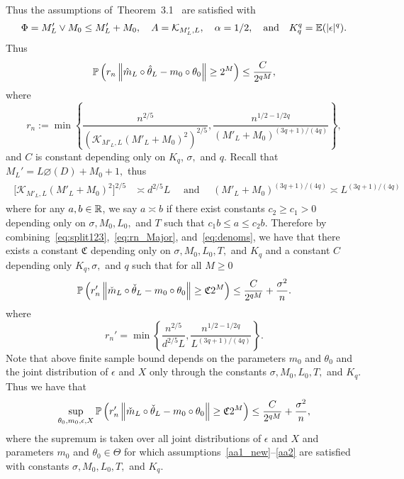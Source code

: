 Thus the assumptions of~{Theorem~3.1}~\cite{KuchiPatra19} are satisfied with 
\begin{equation}\label{eq:notation_matching}
\Phi = M'_L \vee M_0 \le M'_L+M_0, \quad A =\mathcal{K}_{M'_L, L}, \quad \alpha =1/2, \quad \text{and} \quad K_q^q =\mathbb{E}(|\epsilon|^q). 
\end{equation}
Thus
\begin{equation}\label{eq:Tail_majorgeneral}
\mathbb{P}\left(r_n\left\lVert\hat{m}_{L}\circ\hat{\theta}_{L} - m_0\circ\theta_0\right\rVert \ge 2^M\right)\le  \frac{C}{2^{qM}},
\end{equation}
where 
\begin{equation}\label{eq:rn_Major}
r_n:= \min \left\{  \frac{n^{2/5}}{(\mathcal{K}_{M'_L, L} (M'_L+M_0)^2)^{2/5}},  \frac{n^{1/2-1/2q}}{( M'_L+M_0)^{(3q+ 1)/(4q)}} \right\},\end{equation}
and $C$ is constant depending only on $K_q$, $\sigma,$ and $q$. Recall that $M_L'=L\diameter(D) + M_0 + 1,$ thus 
\begin{align}\label{eq:denoms}
\begin{split}
\big[\mathcal{K}_{M'_L, L} (M'_L+M_0)^2\big]^{2/5} &\asymp d^{2/5}L\quad \text{ and }\quad
( M'_L+M_0)^{(3q+ 1)/(4q)} \asymp L^{(3q+ 1)/(4q)}
\end{split}
\end{align}
where for any $a,b\in\mathbb{R}$, we say $a\asymp b$ if there exist constants $c_2 \ge c_1 > 0$ depending only on $\sigma, M_0, L_0,$ and $T$ such that $c_1 b \le a \le c_2b$.
Therefore by combining~\eqref{eq:split123},~\eqref{eq:rn_Major}, and~\eqref{eq:denoms}, we have that there exists a constant $\mathfrak{C}$ depending only on $\sigma, M_0, L_0, T,$ and $K_q$ and a constant $C$ depending only $K_q, \sigma,$ and $q$ such that for all $M\ge 0$ 
 \[
 \mathbb{P}\left( r_n'\left\lVert\check{m}_L\circ\check{\theta}_L - m_0\circ\theta_0\right\rVert \ge \mathfrak{C}2^M\right) \le \frac{C}{2^{qM}}+ \frac{\sigma^2}{n}.
 \]
 where 
 \begin{equation}\label{eq:rnprime}
 r_n'= \min \left\{  \frac{n^{2/5}}{d^{2/5}L},  \frac{n^{1/2-1/2q}}{L^{(3q+ 1)/(4q)}} \right\}.
 \end{equation} Note that above finite sample bound depends on the parameters $m_0$ and $\theta_0$ and the joint distribution of $\epsilon$ and $X$ only through the constants $\sigma, M_0, L_0, T,$ and $K_q$. Thus we have that 
\[ \sup_{\theta_0, m_0,\epsilon, X}  \mathbb{P}\left( r_n'\left\lVert\check{m}_L\circ\check{\theta}_L - m_0\circ\theta_0\right\rVert \ge \mathfrak{C}2^M\right) \le \frac{C}{2^{qM}}+ \frac{\sigma^2}{n},\]
where the supremum is taken over all joint distributions of $\epsilon$ and $X$ and parameters $m_0$ and $ \theta_0\in \Theta$ for which assumptions~\ref{aa1_new}--\ref{aa2} are satisfied with constants $\sigma, M_0, L_0, T,$ and  $K_q.$



